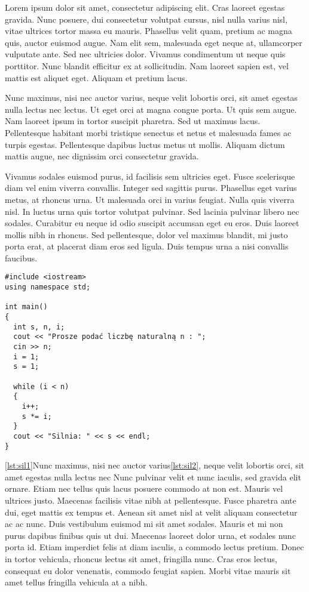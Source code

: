 \documentclass[11pt,a4paper]{article}
\author{Krzysztof Stasiowski}
\begin{document}
Lorem ipsum dolor sit amet, consectetur adipiscing elit. Cras laoreet egestas gravida. Nunc posuere, dui consectetur volutpat cursus, nisl nulla varius nisl, vitae ultrices tortor massa eu mauris. Phasellus velit quam, pretium ac magna quis, auctor euismod augue. Nam elit sem, malesuada eget neque at, ullamcorper vulputate ante. Sed nec ultricies dolor. Vivamus condimentum ut neque quis porttitor. Nunc blandit efficitur ex at sollicitudin. Nam laoreet sapien est, vel mattis est aliquet eget. Aliquam et pretium lacus.

Nunc maximus, nisi nec auctor varius, neque velit lobortis orci, sit amet egestas nulla lectus nec lectus. Ut eget orci at magna congue porta. Ut quis sem augue. Nam laoreet ipsum in tortor suscipit pharetra. Sed ut maximus lacus. Pellentesque habitant morbi tristique senectus et netus et malesuada fames ac turpis egestas. Pellentesque dapibus luctus metus ut mollis. Aliquam dictum mattis augue, nec dignissim orci consectetur gravida.

Vivamus sodales euismod purus, id facilisis sem ultricies eget. Fusce scelerisque diam vel enim viverra convallis. Integer sed sagittis purus. Phasellus eget varius metus, at rhoncus urna. Ut malesuada orci in varius feugiat. Nulla quis viverra nisl. In luctus urna quis tortor volutpat pulvinar. Sed lacinia pulvinar libero nec sodales. Curabitur eu neque id odio suscipit accumsan eget eu eros. Duis laoreet mollis nibh in rhoncus. Sed pellentesque, dolor vel maximus blandit, mi justo porta erat, at placerat diam eros sed ligula. Duis tempus urna a nisi convallis faucibus.


\begin{lstlisting}[caption=tytuł2,label=lst:sil1,float=h,frame=single]
#include <iostream>
using namespace std;

int main()
{
  int s, n, i;
  cout << "Prosze podać liczbę naturalną n : ";
  cin >> n;
  i = 1;
  s = 1;
  
  while (i < n)
  {
    i++;
    s *= i;
  }
  cout << "Silnia: " << s << endl;
}
\end{lstlisting}

\ref{lst:sil1}Nunc maximus, nisi nec auctor varius\ref{lst:sil2}, neque velit lobortis orci, sit amet egestas nulla lectus nec 
Nunc pulvinar velit et nunc iaculis, sed gravida elit ornare. Etiam nec tellus quis lacus posuere commodo at non est. Mauris vel ultrices justo. Maecenas facilisis vitae nibh at pellentesque. Fusce pharetra ante dui, eget mattis ex tempus et. Aenean sit amet nisl at velit aliquam consectetur ac ac nunc. Duis vestibulum euismod mi sit amet sodales. Mauris et mi non purus dapibus finibus quis ut dui. Maecenas laoreet dolor urna, et sodales nunc porta id. Etiam imperdiet felis at diam iaculis, a commodo lectus pretium. Donec in tortor vehicula, rhoncus lectus sit amet, fringilla nunc. Cras eros lectus, consequat eu dolor venenatis, commodo feugiat sapien. Morbi vitae mauris sit amet tellus fringilla vehicula at a nibh.
\end{document}
